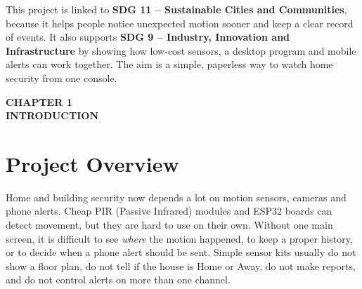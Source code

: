 \documentclass[12pt,a4paper]{report}
\begin{document}
\vspace{0.5cm}

This project is linked to \textbf{SDG 11 -- Sustainable Cities and Communities}, because it helps people notice unexpected motion sooner and keep a clear record of events. It also supports \textbf{SDG 9 -- Industry, Innovation and Infrastructure} by showing how low-cost sensors, a desktop program and mobile alerts can work together. The aim is a simple, paperless way to watch home security from one console.


\clearpage
{}
\pagestyle{empty}

\tableofcontents

\clearpage

\listoffigures
\listoftables

\clearpage

\pagestyle{maincontent}



\cleardoublepage
\thispagestyle{empty}

\null
\vfill

\begin{center}
    {\fontsize{16pt}{18pt}\selectfont\bfseries
    CHAPTER 1}\\[0.5cm]

    {\fontsize{16pt}{18pt}\selectfont\bfseries
    INTRODUCTION}
\end{center}

\vfill
\null

\clearpage

\section{Project Overview}

Home and building security now depends a lot on motion sensors, cameras and phone alerts. Cheap PIR (Passive Infrared) modules and ESP32 boards can detect movement, but they are hard to use on their own. Without one main screen, it is difficult to see \emph{where} the motion happened, to keep a proper history, or to decide when a phone alert should be sent. Simple sensor kits usually do not show a floor plan, do not tell if the house is Home or Away, do not make reports, and do not control alerts on more than one channel.
\end{document}
